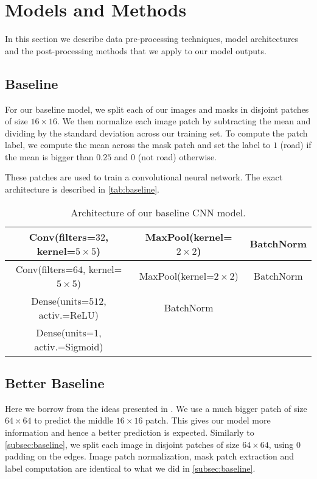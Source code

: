 \section{Models and Methods} \label{sec:models-and-methods}
In this section we describe data pre-processing techniques, model architectures and the post-processing methods that we apply to our model outputs.

\subsection{Baseline} \label{subsec:baseline}
For our baseline model, we split each of our images and masks in disjoint patches of size $16 \times 16$. We then normalize each image patch by subtracting the mean and dividing by the standard deviation across our training set. To compute the patch label, we compute the mean across the mask patch and set the label to $1$ (road) if the mean is bigger than $0.25$ and $0$ (not road) otherwise.

These patches are used to train a convolutional neural network. The exact architecture is described in \autoref{tab:baseline}.

\begin{table}[h]
    \centering
    \begin{tabular}{|c|c|c|}
        \hline
        Conv(filters=$32$, kernel=$5 \times 5$) & MaxPool(kernel=$2 \times 2$) & BatchNorm \\
        \hline
        \hline
        Conv(filters=$64$, kernel=$5 \times 5$) & MaxPool(kernel=$2 \times 2$) & BatchNorm \\
        \hline
        \hline
        Dense(units=$512$, activ.=ReLU) & BatchNorm &  \\
        \hline
        \hline
        Dense(units=$1$, activ.=Sigmoid) & & \\
        \hline
    \end{tabular}
    \caption{Architecture of our baseline CNN model.}
    \label{tab:baseline}
\end{table}

\subsection{Better Baseline} \label{subsec:better-baseline}
Here we borrow from the ideas presented in \cite{Mni10}. We use a much bigger patch of size $64 \times 64$ to predict the middle $16 \times 16$ patch. This gives our model more information and hence a better prediction is expected. Similarly to \autoref{subsec:baseline}, we split each image in disjoint patches of size $64 \times 64$, using $0$ padding on the edges. Image patch normalization, mask patch extraction and label computation are identical to what we did in \autoref{subsec:baseline}.

